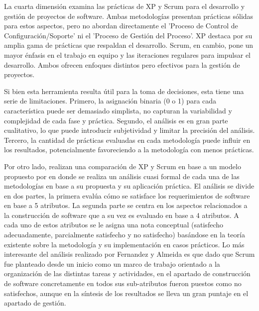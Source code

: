 \documentclass[a4paper,10pt]{article}
\begin{document}
	La cuarta dimensión examina las prácticas de XP y Scrum para el desarrollo y gestión de proyectos de software. Ambas metodologías presentan prácticas sólidas para estos aspectos, pero no abordan directamente el 'Proceso de Control de Configuración/Soporte' ni el 'Proceso de Gestión del Proceso'. XP destaca por su amplia gama de prácticas que respaldan el desarrollo. Scrum, en cambio, pone un mayor énfasis en el trabajo en equipo y las iteraciones regulares para impulsar el desarrollo. Ambos ofrecen enfoques distintos pero efectivos para la gestión de proyectos.
	
	Si bien esta herramienta resulta útil para la toma de decisiones, esta tiene una serie de limitaciones. Primero, la asignación binaria (0 o 1) para cada característica puede ser demasiado simplista, no capturan la variabilidad y complejidad de cada fase y práctica. Segundo, el análisis es en gran parte cualitativo, lo que puede introducir subjetividad y limitar la precisión del análisis. Tercero, la cantidad de prácticas evaluadas en cada metodología puede influir en los resultados, potencialmente favoreciendo a la metodología con menos prácticas.
	
	Por otro lado, \textcite{fernandes2010classification} realizan una comparación de XP y Scrum en base a un modelo propuesto por \textcite{sol1983feature} en donde se realiza un análisis cuasi formal de cada una de las metodologías en base a su propuesta y su aplicación práctica. El análisis se divide en dos partes, la primera evalúa cómo se satisface los requerimientos de software en base a 5 atributos. La segunda parte se centra en los aspectos relacionados a la construcción de software que a su vez es evaluado en base a 4 atributos. A cada uno de estos atributos se le asigna una nota conceptual (satisfecho adecuadamente, parcialmente satisfecho y no satisfecho) basándose en la teoría existente sobre la metodología y su implementación en casos prácticos. Lo más interesante del análisis realizado por Fernandez y Almeida es que dado que Scrum fue planteado desde un inicio como un marco de trabajo orientado a la organización de las distintas tareas y actividades, en el apartado de construcción de software concretamente en todos sus sub-atributos fueron puestos como no satisfechos, aunque en la síntesis de los resultados se lleva un gran puntaje en el apartado de gestión.
	
\end{document}
